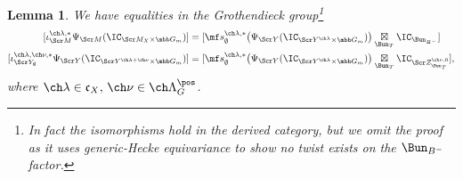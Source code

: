 \documentclass[final]{amsart}
\newtheorem{lem}[subsubsection]{Lemma}
\theoremstyle{remark}
\theoremstyle{definition}
\numberwithin{equation}{section}
\begin{document}
\begin{lem} \label{lem:Psireduction}
We have equalities in the Grothendieck group\footnote{In fact the isomorphisms hold in the derived category, but we omit the proof as it uses generic-Hecke equivariance to show no
twist exists on the $\Bun_{B^-}$ factor.}
\begin{align}
\label{e:YimpliesM}
    [\iota^{\ch\lambda,*}_{\Scr M} \Psi_{\Scr M}(\IC_{\Scr M_X\times \mbb G_m})] &= [\mf s^{\ch\lambda,*}_\emptyset \bigl(\Psi_{\Scr Y}(\IC_{\Scr Y^{\ch\lambda}\times\mbb G_m})\bigr) \underset{\Bun_T}{\boxtimes} \IC_{\Bun_{B^-}}]  \\ 
\label{e:MimpliesY}
    [\iota^{\ch\lambda,\ch\nu,*}_{\Scr Y_\emptyset} \Psi_{\Scr Y}(\IC_{\Scr Y^{\ch\lambda+\ch\nu} \times \mbb G_m})] &= [\mf s^{\ch\lambda,*}_\emptyset \bigl(\Psi_{\Scr Y}(\IC_{\Scr Y^{\ch\lambda} \times \mbb G_m}) \bigr) \underset{\Bun_T}\boxtimes \IC_{\Scr Z^{\ch\nu,0}_{\Bun_T}}],
\end{align}
where $\ch\lambda\in \mathfrak c_X, \,\ch\nu\in \ch\Lambda^\pos_G$. 
\end{lem}
\end{document}

